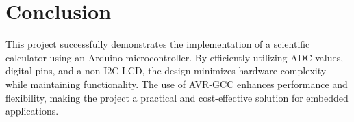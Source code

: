 \documentclass[journal]{IEEEtran}
\begin{document}
\section{Conclusion} This project successfully demonstrates the implementation of a scientific calculator using an Arduino microcontroller. By efficiently utilizing ADC values, digital pins, and a non-I2C LCD, the design minimizes hardware complexity while maintaining functionality. The use of AVR-GCC enhances performance and flexibility, making the project a practical and cost-effective solution for embedded applications.




    
\end{document}
